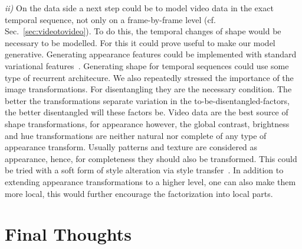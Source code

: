 	\emph{ii)} On the data side a next step could be to model video data in the exact temporal sequence, not only on a frame-by-frame level (cf. Sec.~\ref{sec:videotovideo}). To do this, the temporal changes of shape would be necessary to be modelled. For this it could prove useful to make our model generative. Generating appearance features could be implemented with standard variational features~\cite{kingma13vae}. Generating shape for temporal sequences could use some type of recurrent architecure.
	We also repeatedly stressed the importance of the image transformations. For disentangling they are the necessary condition. The better the transformations separate variation in the to-be-disentangled-factors, the better disentangled will these factors be. Video data are the best source of shape transformations, for appearance however, the global contrast, brightness and hue transformations are neither natural nor complete of any type of appearance transform. Usually patterns and texture are considered as appearance, hence, for completeness they should also be transformed. This could be tried with a soft form of style alteration via style transfer~\cite{gatys15neuralstyle}. In addition to extending appearance transformations to a higher level, one can also make them more local, this would further encourage the factorization into local parts.


\section{Final Thoughts}\label{sec:finalthoughts}


